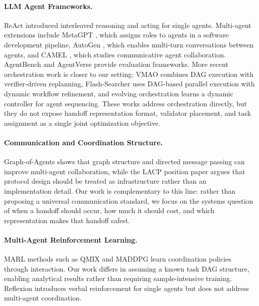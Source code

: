 \documentclass[10pt, twocolumn]{article}
\begin{document}
\paragraph{LLM Agent Frameworks.}
ReAct \citep{yao2023react} introduced interleaved reasoning and acting for single agents. Multi-agent extensions include MetaGPT \citep{hong2023metagpt}, which assigns roles to agents in a software development pipeline, AutoGen \citep{wu2023autogen}, which enables multi-turn conversations between agents, and CAMEL \citep{li2023camel}, which studies communicative agent collaboration. AgentBench \citep{liu2023agentbench} and AgentVerse \citep{chen2024agentverse} provide evaluation frameworks. More recent orchestration work is closer to our setting: VMAO \citep{zhang2026vmao} combines DAG execution with verifier-driven replanning, Flash-Searcher \citep{qin2026flashsearcher} uses DAG-based parallel execution with dynamic workflow refinement, and evolving orchestration \citep{dang2025evolving} learns a dynamic controller for agent sequencing. These works address orchestration directly, but they do not expose handoff representation format, validator placement, and task assignment as a single joint optimization objective.

\paragraph{Communication and Coordination Structure.}
Graph-of-Agents \citep{yun2026goa} shows that graph structure and directed message passing can improve multi-agent collaboration, while the LACP position paper \citep{li2025lacp} argues that protocol design should be treated as infrastructure rather than an implementation detail. Our work is complementary to this line: rather than proposing a universal communication standard, we focus on the systems question of when a handoff should occur, how much it should cost, and which representation makes that handoff safest.

\paragraph{Multi-Agent Reinforcement Learning.}
MARL methods such as QMIX \citep{rashid2020qmix} and MADDPG \citep{lowe2017multi} learn coordination policies through interaction. Our work differs in assuming a known task DAG structure, enabling analytical results rather than requiring sample-intensive training. Reflexion \citep{shinn2023reflexion} introduces verbal reinforcement for single agents but does not address multi-agent coordination.
\end{document}
